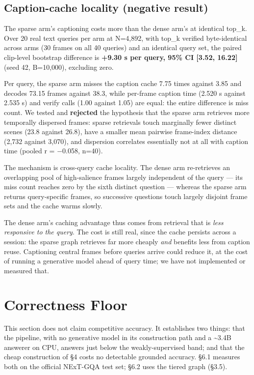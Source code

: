 \documentclass[sigconf,review,anonymous]{acmart}
\begin{document}
\subsection{Caption-cache locality (negative result)}

The sparse arm's captioning costs more than the dense arm's at identical top\_k. Over 20 real
text queries per arm at N=4,892, with top\_k verified byte-identical across arms (30 frames
on all 40 queries) and an identical query set, the paired clip-level bootstrap difference is
\textbf{+9.30 s per query, 95\% CI {[}3.52, 16.22{]}} (seed 42, B=10,000), excluding zero.

Per query, the sparse arm misses the caption cache 7.75 times against 3.85 and decodes 73.15
frames against 38.3, while per-frame caption time (2.520 s against 2.535 s) and verify calls
(1.00 against 1.05) are equal: the entire difference is miss count. We tested and
\textbf{rejected} the hypothesis that the sparse arm retrieves more temporally dispersed frames:
sparse retrievals touch marginally fewer distinct scenes (23.8 against 26.8), have a smaller
mean pairwise frame-index distance (2,732 against 3,070), and dispersion correlates
essentially not at all with caption time (pooled r = \ensuremath{-}0.058, n=40).

The mechanism is cross-query cache locality. The dense arm re-retrieves an overlapping pool
of high-salience frames largely independent of the query --- its miss count reaches zero by
the sixth distinct question --- whereas the sparse arm returns query-specific frames, so
successive questions touch largely disjoint frame sets and the cache warms slowly.

The dense arm's caching advantage thus comes from retrieval that is \emph{less responsive to the
query}. The cost is still real, since the cache persists across a session: the sparse graph
retrieves far more cheaply \emph{and} benefits less from caption reuse. Captioning
central frames before queries arrive could reduce it, at the cost of running a generative model
ahead of query time; we have not implemented or measured that.

\section{Correctness Floor}

This section does not claim competitive accuracy. It establishes two things: that the pipeline,
with no generative model in its construction path and a \textasciitilde3.4B answerer on CPU, answers
just below the weakly-supervised band; and that the cheap construction of §4 costs no
detectable grounded accuracy. §6.1 measures both on the official NExT-GQA test set; §6.2 uses
the tiered graph (§3.5).
\end{document}
